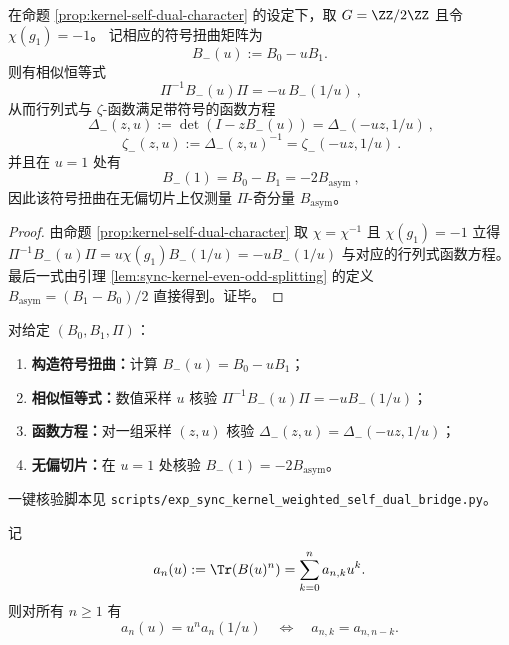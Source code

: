 \begin{corollary}[符号扭曲 \texorpdfstring{$\chi(g_1)=-1$}{chi(g1)=-1} 的自对偶函数方程与 \texorpdfstring{$u=1$}{u=1} 的“纯奇部”读出]\label{cor:kernel-self-dual-sign-twist}
在命题 \ref{prop:kernel-self-dual-character} 的设定下，取 \(G=\ZZ/2\ZZ\) 且令 \(\chi(g_1)=-1\)。
记相应的符号扭曲矩阵为
\[
B_{-}(u):=B_0-uB_1.
\]
则有相似恒等式
\[
\boxed{\ \Pi^{-1}B_{-}(u)\Pi=-u\,B_{-}(1/u)\ },
\]
从而行列式与 \(\zeta\)-函数满足带符号的函数方程
\[
\boxed{\ \Delta_{-}(z,u):=\det(I-zB_{-}(u))=\Delta_{-}(-uz,1/u)\ },
\]
\[
\boxed{\ \zeta_{-}(z,u):=\Delta_{-}(z,u)^{-1}=\zeta_{-}(-uz,1/u)\ }.
\]
并且在 \(u=1\) 处有
\[
\boxed{\ B_{-}(1)=B_0-B_1=-2B_{\mathrm{asym}}\ },
\]
因此该符号扭曲在无偏切片上仅测量 \(\Pi\)-奇分量 \(B_{\mathrm{asym}}\)。
\end{corollary}

\begin{proof}
由命题 \ref{prop:kernel-self-dual-character} 取 \(\chi=\chi^{-1}\) 且 \(\chi(g_1)=-1\) 立得
\(
\Pi^{-1}B_{-}(u)\Pi=u\chi(g_1)B_{-}(1/u)=-uB_{-}(1/u)
\)
与对应的行列式函数方程。
最后一式由引理 \ref{lem:sync-kernel-even-odd-splitting} 的定义 \(B_{\mathrm{asym}}=(B_1-B_0)/2\) 直接得到。证毕。
\end{proof}

\begin{remark}\label{rem:kernel-self-dual-sign-twist-bridge}
对给定 \((B_0,B_1,\Pi)\)：
\begin{enumerate}
  \item \textbf{构造符号扭曲：}计算 \(B_{-}(u)=B_0-uB_1\)；
  \item \textbf{相似恒等式：}数值采样 \(u\) 核验 \(\Pi^{-1}B_{-}(u)\Pi=-uB_{-}(1/u)\)；
  \item \textbf{函数方程：}对一组采样 \((z,u)\) 核验 \(\Delta_{-}(z,u)=\Delta_{-}(-uz,1/u)\)；
  \item \textbf{无偏切片：}在 \(u=1\) 处核验 \(B_{-}(1)=-2B_{\mathrm{asym}}\)。
\end{enumerate}
一键核验脚本见 \texttt{scripts/exp\_sync\_kernel\_weighted\_self\_dual\_bridge.py}。
\end{remark}

\begin{proposition}[周期迹多项式的回文对称]\label{prop:trace-palindrome}
记
\[
a_n(u):=\Tr(B(u)^n)=\sum_{k=0}^{n}a_{n,k}u^k.
\]
则对所有 $n\ge 1$ 有
\[
a_n(u)=u^n a_n(1/u)
\quad\Longleftrightarrow\quad
a_{n,k}=a_{n,n-k}.
\]
\end{proposition}

